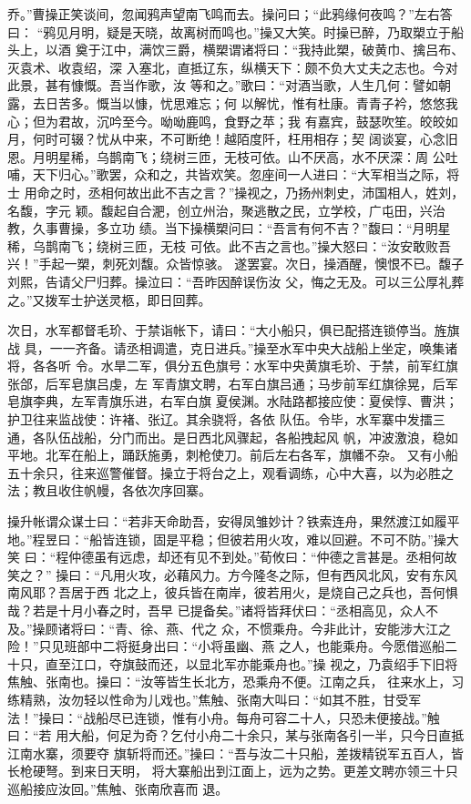 乔。”曹操正笑谈间，忽闻鸦声望南飞鸣而去。操问曰；“此鸦缘何夜鸣？”左右答曰：
“鸦见月明，疑是天晓，故离树而鸣也。”操又大笑。时操已醉，乃取槊立于船头上，以酒
奠于江中，满饮三爵，横槊谓诸将曰：“我持此槊，破黄巾、擒吕布、灭袁术、收袁绍，深
入塞北，直抵辽东，纵横天下：颇不负大丈夫之志也。今对此景，甚有慷慨。吾当作歌，汝
等和之。”歌曰：“对酒当歌，人生几何：譬如朝露，去日苦多。慨当以慷，忧思难忘；何
以解忧，惟有杜康。青青子衿，悠悠我心；但为君故，沉吟至今。呦呦鹿鸣，食野之苹；我
有嘉宾，鼓瑟吹笙。皎皎如月，何时可辍？忧从中来，不可断绝！越陌度阡，枉用相存；契
阔谈宴，心念旧恩。月明星稀，乌鹊南飞；绕树三匝，无枝可依。山不厌高，水不厌深：周
公吐哺，天下归心。”歌罢，众和之，共皆欢笑。忽座间一人进曰：“大军相当之际，将士
用命之时，丞相何故出此不吉之言？”操视之，乃扬州刺史，沛国相人，姓刘，名馥，字元
颖。馥起自合淝，创立州治，聚逃散之民，立学校，广屯田，兴治教，久事曹操，多立功
绩。当下操横槊问曰：“吾言有何不吉？”馥曰：“月明星稀，乌鹊南飞；绕树三匝，无枝
可依。此不吉之言也。”操大怒曰：“汝安敢败吾兴！”手起一槊，刺死刘馥。众皆惊骇。
遂罢宴。次日，操酒醒，懊恨不已。馥子刘熙，告请父尸归葬。操泣曰：“吾昨因醉误伤汝
父，悔之无及。可以三公厚礼葬之。”又拨军士护送灵柩，即日回葬。

次日，水军都督毛玠、于禁诣帐下，请曰：“大小船只，俱已配搭连锁停当。旌旗战
具，一一齐备。请丞相调遣，克日进兵。”操至水军中央大战船上坐定，唤集诸将，各各听
令。水旱二军，俱分五色旗号：水军中央黄旗毛玠、于禁，前军红旗张郃，后军皂旗吕虔，左
军青旗文聘，右军白旗吕通；马步前军红旗徐晃，后军皂旗李典，左军青旗乐进，右军白旗
夏侯渊。水陆路都接应使：夏侯惇、曹洪；护卫往来监战使：许褚、张辽。其余骁将，各依
队伍。令毕，水军寨中发擂三通，各队伍战船，分门而出。是日西北风骤起，各船拽起风
帆，冲波激浪，稳如平地。北军在船上，踊跃施勇，刺枪使刀。前后左右各军，旗幡不杂。
又有小船五十余只，往来巡警催督。操立于将台之上，观看调练，心中大喜，以为必胜之
法；教且收住帆幔，各依次序回寨。

操升帐谓众谋士曰：“若非天命助吾，安得凤雏妙计？铁索连舟，果然渡江如履平
地。”程昱曰：“船皆连锁，固是平稳；但彼若用火攻，难以回避。不可不防。”操大笑
曰：“程仲德虽有远虑，却还有见不到处。”荀攸曰：“仲德之言甚是。丞相何故笑之？”
操曰：“凡用火攻，必藉风力。方今隆冬之际，但有西风北风，安有东风南风耶？吾居于西
北之上，彼兵皆在南岸，彼若用火，是烧自己之兵也，吾何惧哉？若是十月小春之时，吾早
已提备矣。”诸将皆拜伏曰：“丞相高见，众人不及。”操顾诸将曰：“青、徐、燕、代之
众，不惯乘舟。今非此计，安能涉大江之险！”只见班部中二将挺身出曰：“小将虽幽、燕
之人，也能乘舟。今愿借巡船二十只，直至江口，夺旗鼓而还，以显北军亦能乘舟也。”操
视之，乃袁绍手下旧将焦触、张南也。操曰：“汝等皆生长北方，恐乘舟不便。江南之兵，
往来水上，习练精熟，汝勿轻以性命为儿戏也。”焦触、张南大叫曰：“如其不胜，甘受军
法！”操曰：“战船尽已连锁，惟有小舟。每舟可容二十人，只恐未便接战。”触曰：“若
用大船，何足为奇？乞付小舟二十余只，某与张南各引一半，只今日直抵江南水寨，须要夺
旗斩将而还。”操曰：“吾与汝二十只船，差拨精锐军五百人，皆长枪硬弩。到来日天明，
将大寨船出到江面上，远为之势。更差文聘亦领三十只巡船接应汝回。”焦触、张南欣喜而
退。

